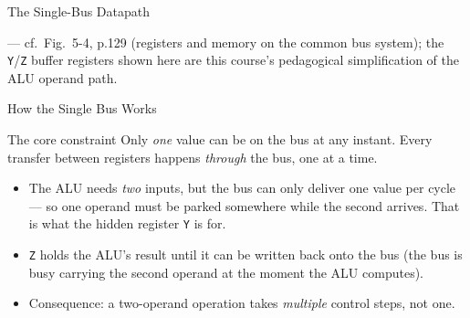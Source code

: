 \documentclass[aspectratio=169]{beamer}
\begin{document}
\begin{frame}{The Single-Bus Datapath}
\begin{center}
  \end{center}
  \footnotesize \cite{Mano1993_computer_system_architecture} --- cf.\ Fig.~5-4, p.129
  (registers and memory on the common bus system); the \texttt{Y}/\texttt{Z} buffer
  registers shown here are this course's pedagogical simplification of the
  ALU operand path.
\end{frame}

\begin{frame}{How the Single Bus Works}
  \begin{block}{The core constraint}
    Only \emph{one} value can be on the bus at any instant. Every transfer between
    registers happens \emph{through} the bus, one at a time.
  \end{block}
  \begin{itemize}
    \item The ALU needs \emph{two} inputs, but the bus can only deliver one value
      per cycle --- so one operand must be parked somewhere while the second
      arrives. That is what the hidden register \texttt{Y} is for.
    \item \texttt{Z} holds the ALU's result until it can be written back onto the
      bus (the bus is busy carrying the second operand at the moment the ALU computes).
    \item Consequence: a two-operand operation takes \emph{multiple} control steps,
      not one.
  \end{itemize}
\end{frame}
\end{document}
